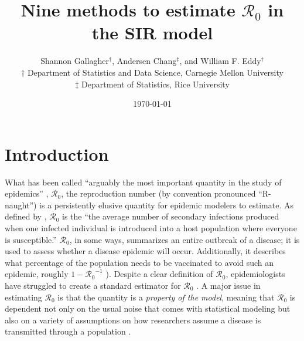 \documentclass[12pt]{article}
\newcommand{\Wxxsir}{Nine } %
\newcommand{\rr}{\ensuremath{\mathcal{R}_0}}
\begin{document}




\title{\Wxxsir methods to estimate $\rr$ in the SIR model}
\author{ Shannon Gallagher$^{\dag}$, Andersen Chang$^{\ddag}$, and William F. Eddy$^{\dag}$ \\$\dag$ Department of Statistics and Data Science, Carnegie Mellon University\\ $\ddag$ Department of Statistics, Rice University}
\date{\today}
\maketitle



\section{Introduction}\label{sec:intro}
What has been called ``arguably the most important quantity in the study of epidemics'' \citep{Heesterbeek2002},  $\mathcal{R}_0$, the reproduction number (by convention pronounced ``R-naught'') is a persistently elusive quantity for epidemic modelers to estimate.  As defined by \citet{anderson1992}, $\rr$ is the ``the average number of secondary infections produced when one infected individual is introduced into a host population where everyone is susceptible.''  $\rr$, in some ways, summarizes an entire outbreak of a disease; it  is used to assess whether a disease epidemic will occur.  Additionally, it describes what percentage of the population needs to be vaccinated to avoid such an epidemic, roughly $1-\rr^{-1}$ \citep{anderson1992}).  Despite a clear definition of $\rr$, epidemiologists have struggled to create a standard  estimator for $\rr$  \citep{hethcote2000}.  A major issue in estimating $\rr$ is that the quantity is a \textit{property of the model}, meaning that $\rr$ is dependent not only on the usual noise that comes with statistical modeling but also on a variety of assumptions on how researchers assume a disease is transmitted through a population \citep{diekmann2009}.
\end{document}
